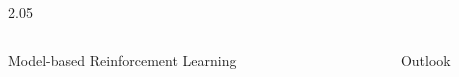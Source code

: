 \documentclass[final,12pt]{beamer}
\newlength{\sepwidth}
\newlength{\colwidth}
\newcommand{\separatorcolumn}{\begin{column}{\sepwidth}\end{column}}
\newlength\figureheight
\newlength\figurewidth
\newcommand{\our}{SFR}
\begin{document}
\begin{frame}[t]
\begin{columns}[t]
\begin{column}{2.05\colwidth}
\begin{columns}[t]
\begin{column}{\colwidth}
\begin{block}{Model-based Reinforcement Learning}

    \end{block}

\end{column}

\separatorcolumn

\begin{column}{\colwidth}

  \begin{block}{Outlook}


\end{block}
\end{column}
\end{columns}
\end{column}
\end{columns}
\end{frame}
\end{document}

